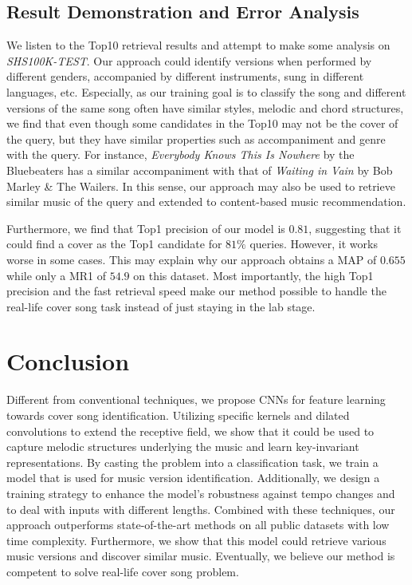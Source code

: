 \documentclass{article}
\begin{document}
  
  
\subsection{Result Demonstration and Error Analysis}
We listen to the Top10 retrieval results and attempt to make some analysis on \textit{SHS100K-TEST}. Our approach could identify versions when performed by different genders, accompanied by different instruments, sung in different languages, etc. Especially, as our training goal is to classify the song and different versions of the same song often have similar styles, melodic and chord structures, we find that even though some candidates in the Top10 may not be the cover of the query, but they have similar properties such as accompaniment and genre with the query. For instance, \textit{Everybody Knows This Is Nowhere} by the Bluebeaters has a similar accompaniment with that of \textit{Waiting in Vain} by Bob Marley \& The Wailers. In this sense, our approach may also be used to retrieve similar music of the query and extended to content-based music recommendation.

Furthermore, we find that Top1 precision of our model is $0.81$, suggesting that it could find a cover as the Top1 candidate for $81\%$ queries. However, it works worse in some cases. This may explain why our approach obtains a MAP of $0.655$ while only a MR1 of $54.9$ on this dataset. Most importantly, the high Top1 precision and the fast retrieval speed make our method possible to handle the real-life cover song task instead of just staying in the lab stage. 



\section{Conclusion}
Different from conventional techniques, we propose CNNs for feature learning towards cover song identification. Utilizing specific kernels and dilated convolutions to extend the receptive field, we show that it could be used to capture melodic structures underlying the music and learn key-invariant representations. By casting the problem into a classification task, we train a model that is used for music version identification. Additionally, we design a training strategy to enhance the model's robustness against tempo changes and to deal with inputs with different lengths. Combined with these techniques, our approach outperforms state-of-the-art methods on all public datasets with low time complexity. Furthermore, we show that this model could retrieve various music versions and discover similar music. Eventually, we believe our method is competent to solve real-life cover song problem.
\vfill\pagebreak





\end{document}
